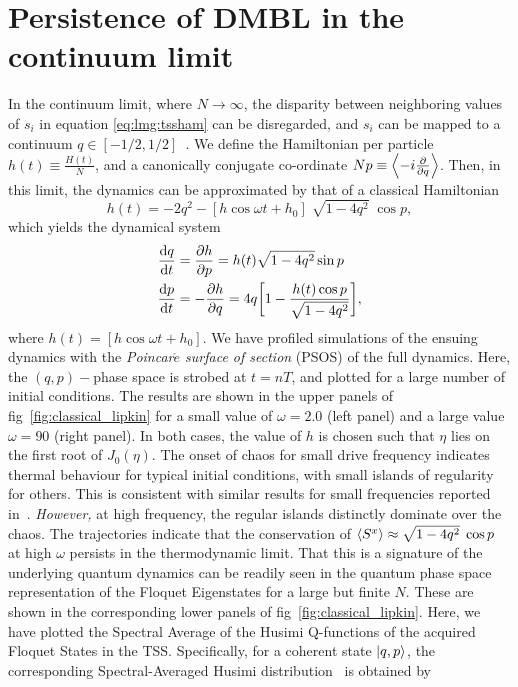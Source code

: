 \documentclass[%
reprint,
superscriptaddress,
linenumbers,
amsmath,amssymb,
aps,
prb,
showkeys,
]{revtex4-2}
\begin{document}
	\section{\label{sec:level4}Persistence of DMBL in the continuum limit}
	In the continuum limit, where $N\rightarrow\infty$, the disparity between neighboring values of $s_i$ in equation \ref{eq:lmg:tssham} can be disregarded, and $s_i$ can be mapped to a continuum $q\in \left[-1/2, 1/2\right]$~\cite{mori_prethermalization_2019}. We define	the Hamiltonian per particle $h(t)\equiv \frac{H(t)}{N}$, and a canonically conjugate co-ordinate $Np\equiv \expval{-i\pdv{}{q}}$. Then, in this limit, the dynamics can be approximated by that of a classical Hamiltonian~\cite{sciolla_quantum_2010}
	\begin{equation}
	h(t) = -2 q^2 - \left[h\cos{\omega t} + h_0\right]\;\sqrt{1-4q^2}\;\cos{p},
	\label{eq:class:ham}
	\end{equation}
	which yields the dynamical system 
	\begin{align}
		 \dv{q}{t} &= \pdv{h}{p} = h(t)\sqrt{1-4q^2}\sin{p}\nonumber \\
		  \dv{p}{t} &= -\pdv{h}{q} = 4q\bigg[1-\frac{h(t)\cos{p}}{\sqrt{1-4q^2}}\bigg],
		\label{eq:class:poinc}
	\end{align}
  where $h(t) = \left[h\cos{\omega t} + h_0\right]$. We have profiled simulations of the ensuing dynamics with the \emph{Poincar$\acute{e}$ surface of section} (PSOS) of the full dynamics. Here, the $\left(q,p\right)-$phase space is strobed at $t=nT$, and plotted for a large number of initial conditions. The results are shown in the upper panels of fig~\ref{fig:classical_lipkin} for a small value of $\omega=2.0$ (left panel) and a large value $\omega=90$ (right panel). In both cases, the value of $h$ is chosen such that $\eta$ lies on the first root of $J_0(\eta)$. The onset of chaos for small drive frequency indicates thermal behaviour for typical initial conditions, with small islands of regularity for others. This is consistent with similar results for small frequencies reported in~\cite{russomanno_thermalization_2015, Kidd2019}. \emph{However,} at high frequency, the regular islands distinctly dominate over the chaos. The trajectories indicate that the conservation of $\expval{S^x}\approx \sqrt{1-4q^2}\;\cos{p}$~\cite{mori_prethermalization_2019} at high $\omega$ persists in the thermodynamic limit.
	That this is a signature of the underlying quantum dynamics can be readily seen in the quantum phase space representation of the Floquet Eigenstates for a large but finite $N$. These are shown in the corresponding lower panels of fig~\ref{fig:classical_lipkin}. Here, we have plotted the Spectral Average of the Husimi Q-functions of the acquired Floquet States in the TSS. Specifically, for a coherent state $\ket{q,p}$, the corresponding Spectral-Averaged Husimi distribution~\cite{husimi} is obtained by 
\end{document}
